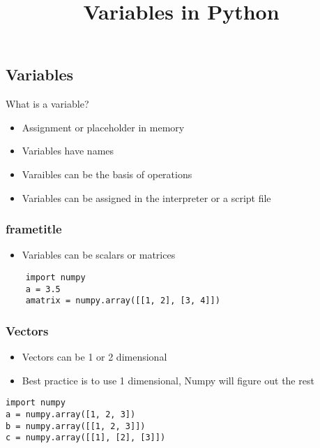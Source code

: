 \documentclass[11pt,professionalfonts]{beamer}
\title[Variables]{\large \textbf{Variables in Python}}
\author{\vspace*{-0.3cm}}
\institute{
  \footnotesize
  {\normalsize\bf{Shankar Kulumani}}\\
  \vspace*{0.2cm}
    \textbf{Flight Dynamics \& Control Lab}\\ \vspace*{0.5cm}
  \begin{figure} %
        \texttt{[image: figures/gw\_txh\_2cs\_pos.pdf]}
    \end{figure}
}
\date{}
\begin{document}

\setcounter{framenumber}{-1}
\begin{frame} %
  \titlepage
\end{frame}   %

\section*{}
\subsection*{Variables}  
\begin{frame}{What is a variable?}
    \begin{itemize}
        \item Assignment or placeholder in memory 
        \item Variables have names
        \item Varaibles can be the basis of operations
        \item Variables can be assigned in the interpreter or a script file
    \end{itemize}
\end{frame}

\begin{frame}[fragile]\frametitle{frametitle}
    \begin{itemize}
        \item Variables can be scalars or matrices
    \end{itemize}
\begin{verbatim}
    import numpy
    a = 3.5
    amatrix = numpy.array([[1, 2], [3, 4]])
\end{verbatim}
\end{frame}

\begin{frame}[fragile]\frametitle{Vectors}
    \begin{itemize}
        \item Vectors can be 1 or 2 dimensional
        \item Best practice is to use 1 dimensional, Numpy will figure out the rest
    \end{itemize}
\begin{verbatim}
import numpy
a = numpy.array([1, 2, 3])
b = numpy.array([[1, 2, 3]])
c = numpy.array([[1], [2], [3]])
\end{verbatim}

\end{frame}
\end{document}
